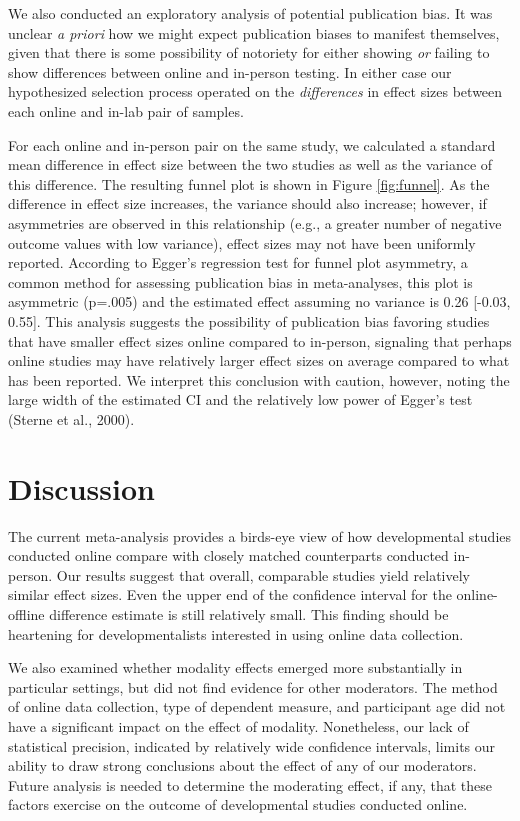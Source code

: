 \documentclass[
  man,floatsintext]{apa6}
\begin{document}
We also conducted an exploratory analysis of potential publication bias. It was unclear \emph{a priori} how we might expect publication biases to manifest themselves, given that there is some possibility of notoriety for either showing \emph{or} failing to show differences between online and in-person testing. In either case our hypothesized selection process operated on the \emph{differences} in effect sizes between each online and in-lab pair of samples.

For each online and in-person pair on the same study, we calculated a standard mean difference in effect size between the two studies as well as the variance of this difference. The resulting funnel plot is shown in Figure \ref{fig:funnel}. As the difference in effect size increases, the variance should also increase; however, if asymmetries are observed in this relationship (e.g., a greater number of negative outcome values with low variance), effect sizes may not have been uniformly reported. According to Egger's regression test for funnel plot asymmetry, a common method for assessing publication bias in meta-analyses, this plot is asymmetric (p=.005) and the estimated effect assuming no variance is 0.26 {[}-0.03, 0.55{]}. This analysis suggests the possibility of publication bias favoring studies that have smaller effect sizes online compared to in-person, signaling that perhaps online studies may have relatively larger effect sizes on average compared to what has been reported. We interpret this conclusion with caution, however, noting the large width of the estimated CI and the relatively low power of Egger's test (Sterne et al., 2000).

\hypertarget{discussion}{%
\section{Discussion}\label{discussion}}

The current meta-analysis provides a birds-eye view of how developmental studies conducted online compare with closely matched counterparts conducted in-person. Our results suggest that overall, comparable studies yield relatively similar effect sizes. Even the upper end of the confidence interval for the online-offline difference estimate is still relatively small. This finding should be heartening for developmentalists interested in using online data collection.

We also examined whether modality effects emerged more substantially in particular settings, but did not find evidence for other moderators. The method of online data collection, type of dependent measure, and participant age did not have a significant impact on the effect of modality. Nonetheless, our lack of statistical precision, indicated by relatively wide confidence intervals, limits our ability to draw strong conclusions about the effect of any of our moderators. Future analysis is needed to determine the moderating effect, if any, that these factors exercise on the outcome of developmental studies conducted online.
\end{document}
